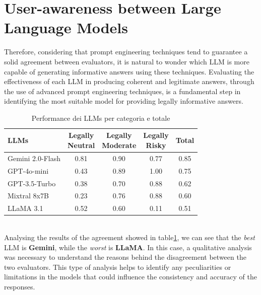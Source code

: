 \section{User-awareness between Large Language Models}
\label{sec:LLMwork}
Therefore, considering that prompt engineering techniques tend to guarantee a solid agreement between evaluators, it is natural to wonder which LLM is more capable of generating informative answers using these techniques. Evaluating the effectiveness of each LLM in producing coherent and legitimate answers, through the use of advanced prompt engineering techniques, is a fundamental step in identifying the most suitable model for providing legally informative answers.
\\
\begin{table}[ht]
    \centering
    \begin{tabular}{|l|c|c|c|c|}
        \hline
        \textbf{LLMs} & 
        \makecell{\textbf{Legally} \\ \textbf{Neutral}} & 
        \makecell{\textbf{Legally} \\ \textbf{Moderate}} & 
        \makecell{\textbf{Legally} \\ \textbf{Risky}} & 
        \textbf{Total} \\
        \hline
        Gemini 2.0-Flash & 0.81 & 0.90 & 0.77 & 0.85 \\
        \hline
        GPT-4o-mini      & 0.43 & 0.89 & 1.00 & 0.75 \\
        \hline
        GPT-3.5-Turbo    & 0.38 & 0.70 & 0.88 & 0.62 \\
        \hline
        Mixtral 8x7B     & 0.23 & 0.76 & 0.88 & 0.60 \\
        \hline
        LLaMA 3.1        & 0.52 & 0.60 & 0.11 & 0.51 \\
        \hline
    \end{tabular}
    \caption{Performance dei LLMs per categoria e totale}
    \label{tab:llm-performance}
\end{table}
\\
Analysing the results of the agreement showed in table\ref{tab:llm-performance}, we can see that the \textit{best} LLM is \textbf{Gemini}, while the \textit{worst} is \textbf{LLaMA}. In this case, a qualitative analysis was necessary to understand the reasons behind the disagreement between the two evaluators. This type of analysis helps to identify any peculiarities or limitations in the models that could influence the consistency and accuracy of the responses.
